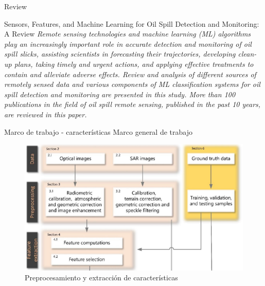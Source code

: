 \begin{frame}{Review}
  \begin{block}{Sensors, Features, and Machine Learning for Oil Spill Detection and Monitoring: A Review \cite{rs12203338}}
    \textit{Remote sensing technologies and machine learning (ML) algorithms play an increasingly   important role in accurate detection and monitoring of oil spill slicks, assisting scientists in forecasting their trajectories, developing clean-up plans, taking timely and urgent actions, and applying effective treatments to contain and alleviate adverse effects. Review and analysis of different sources of remotely sensed data and various components of ML classification systems for oil spill detection and monitoring are presented in this study. More than 100 publications in the field of oil spill remote sensing, published in the past 10 years, are reviewed in this paper.}
  \end{block}  
\end{frame}

\begin{frame}{Marco de trabajo - características}
  \footnotesize
  Marco general de trabajo
  \begin{figure}
      \centering
      \includegraphics[scale=0.6]{img/section_02/framework_spill_detection.png}
      \caption{Preprocesamiento y extracción de características \cite{rs12203338}}
      \label{fig:preprocessing_and_feature_extraction}
  \end{figure}
\end{frame}

